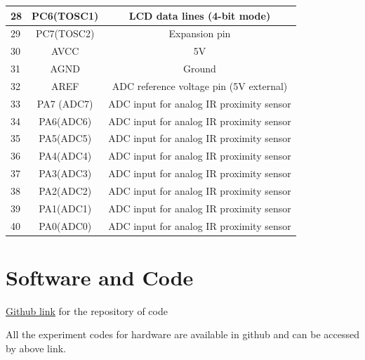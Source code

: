 \documentclass[a4paper,12pt,oneside]{book}
\begin{document}
\begin{itemize}
\begin{tabular*}{\textwidth}{|l|c|c|}
	\hline
	28 & PC6(TOSC1) & LCD data lines (4-bit mode) \\
	\hline
	29 & PC7(TOSC2) & Expansion pin \\
	\hline
	30 & AVCC & 5V \\
	\hline
	31 & AGND & Ground \\
	\hline
	32 & AREF & ADC reference voltage pin (5V external) \\
	\hline
	33 & PA7 (ADC7) & ADC input for analog IR proximity sensor\\
	\hline
	34 & PA6(ADC6) & ADC input for analog IR proximity sensor\\
	\hline
	35 & PA5(ADC5) & ADC input for analog IR proximity sensor\\
	\hline
	36 & PA4(ADC4) & ADC input for analog IR proximity sensor\\
	\hline
	37 & PA3(ADC3) & ADC input for analog IR proximity sensor\\
	\hline
	38 & PA2(ADC2) & ADC input for analog IR proximity sensor\\
	\hline
	39 & PA1(ADC1) & ADC input for analog IR proximity sensor\\
	\hline
	40 & PA0(ADC0) & ADC input for analog IR proximity sensor\\
	\hline
\end{tabular*}

\end{itemize}

\section{Software and Code}
\href{https://github.com/eYSIP-2017/eYSIP-2017_DistributedRobotics.git}{Github link} for the repository of code

All the experiment codes for hardware are available in github and can be accessed by above link.
\end{document}
